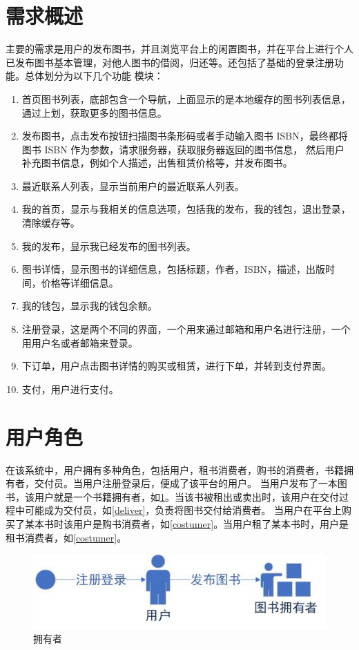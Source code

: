 \section{需求概述}
主要的需求是用户的发布图书，并且浏览平台上的闲置图书，并在平台上进行个人
已发布图书基本管理，对他人图书的借阅，归还等。还包括了基础的登录注册功能。总体划分为以下几个功能
模块：

\begin{enumerate}
	\item 首页图书列表，底部包含一个导航，上面显示的是本地缓存的图书列表信息，通过上划，获取更多的图书信息。
	\item 发布图书，点击发布按钮扫描图书条形码或者手动输入图书 ISBN，最终都将图书 ISBN 作为参数，请求服务器，获取服务器返回的图书信息，
	然后用户补充图书信息，例如个人描述，出售租赁价格等，并发布图书。
	\item 最近联系人列表，显示当前用户的最近联系人列表。
	\item 我的首页，显示与我相关的信息选项，包括我的发布，我的钱包，退出登录，清除缓存等。
	\item 我的发布，显示我已经发布的图书列表。
	\item 图书详情，显示图书的详细信息，包括标题，作者，ISBN，描述，出版时间，价格等详细信息。
	\item 我的钱包，显示我的钱包余额。
	\item 注册登录，这是两个不同的界面，一个用来通过邮箱和用户名进行注册，一个用用户名或者邮箱来登录。
	\item 下订单，用户点击图书详情的购买或租赁，进行下单，并转到支付界面。
	\item 支付，用户进行支付。
\end{enumerate}

\section{用户角色}
在该系统中，用户拥有多种角色，包括用户，租书消费者，购书的消费者，书籍拥有者，交付员。当用户注册登录后，便成了该平台的用户。
当用户发布了一本图书，该用户就是一个书籍拥有者，如\cref{owner}。当该书被租出或卖出时，该用户在交付过程中可能成为交付员，如\cref{deliver}，负责将图书交付给消费者。
当用户在平台上购买了某本书时该用户是购书消费者，如\cref{costumer}。当用户租了某本书时，用户是租书消费者，如\cref{costumer}。

\begin{figure}[h]
	\centering
	\includegraphics[scale=0.65]{Chapters/UML/owner.jpg}
	\caption{拥有者}
	\label{owner}
\end{figure}

